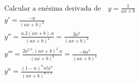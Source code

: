 \begin{ex}
\begin{align}
&\text{Calcular a enésima derivada de}\quad y=\frac{1}{ax+b}\nonumber\\
&y'=\frac{-a}{(ax+b)^2}\nonumber\\
&y''=\frac{a.2(ax+b).a}{(ax+b)^4}=\frac{2a^2}{(ax+b)^3}\nonumber\\
&y'''=\frac{2a^2.3.(ax+b)^2.a}{(ax+b)^6}=\frac{-6a^3}{(ax+b)^4}\nonumber\\
&y^{n}=\frac{(1-n)^{n}n!a^{n}}{(ax+b)^{n+1}}\nonumber
\end{align}
\end{ex}
